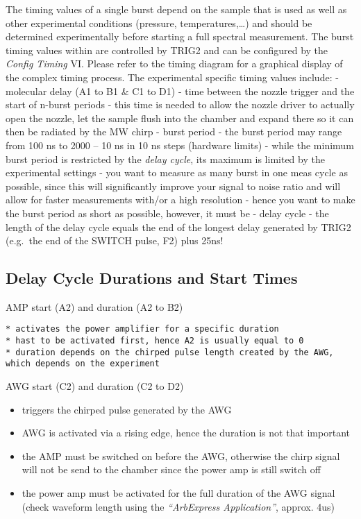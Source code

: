 The timing values of a single burst depend on the sample that is used as
well as other experimental conditions (pressure, temperatures,\ldots{})
and should be determined experimentally before starting a full spectral
measurement. The burst timing values within are controlled by TRIG2 and
can be configured by the \emph{Config Timing} VI. Please refer to the
timing diagram for a graphical display of the complex timing process.
The experimental specific timing values include: - molecular delay (A1
to B1 \& C1 to D1) - time between the nozzle trigger and the start of
n-burst periods - this time is needed to allow the nozzle driver to
actually open the nozzle, let the sample flush into the chamber and
expand there so it can then be radiated by the MW chirp - burst period -
the burst period may range from 100 ns to 2000 -- 10 ns in 10 ns steps
(hardware limits) - while the minimum burst period is restricted by the
\emph{delay cycle}, its maximum is limited by the experimental settings
- you want to measure as many burst in one meas cycle as possible, since
this will significantly improve your signal to noise ratio and will
allow for faster measurements with/or a high resolution - hence you want
to make the burst period as short as possible, however, it must be -
delay cycle - the length of the delay cycle equals the end of the
longest delay generated by TRIG2 (e.g.~the end of the SWITCH pulse, F2)
plus 25ns!

\subsection{Delay Cycle Durations and Start Times}

AMP start (A2) and duration (A2 to B2)

\begin{verbatim}
* activates the power amplifier for a specific duration
* hast to be activated first, hence A2 is usually equal to 0
* duration depends on the chirped pulse length created by the AWG, which depends on the experiment
\end{verbatim}

AWG start (C2) and duration (C2 to D2)

\begin{itemize}
\item
  triggers the chirped pulse generated by the AWG
\item
  AWG is activated via a rising edge, hence the duration is not that
  important
\item
  the AMP must be switched on before the AWG, otherwise the chirp signal
  will not be send to the chamber since the power amp is still switch
  off
\item
  the power amp must be activated for the full duration of the AWG
  signal (check waveform length using the \emph{``ArbExpress
  Application''}, approx. 4us)
\end{itemize}

